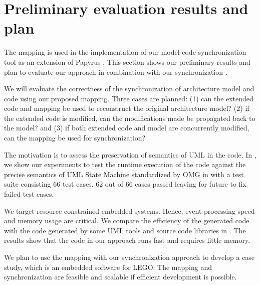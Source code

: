 \section{Preliminary evaluation results and plan}
\label{sec:evaluationplan}
The mapping is used in the implementation of our model-code synchronization tool \cite{foster2016} as an extension of Papyrus \cite{gerard201019}.
This section shows our preliminary results and plan to evaluate our approach in combination with our synchronization \cite{foster2016}.

\noindent
{}
We will evaluate the correctness of the synchronization of architecture model and code using our proposed mapping.
Three cases are planned: (1) can the extended code and mapping be used to reconstruct the original architecture model? (2) if the extended code is modified, can the modifications made be propagated back to the model? and (3) if both extended code and model are concurrently modified, can the mapping be used for synchronization?

\noindent
{}
The motivation is to assess the preservation of semantics of UML in the code.
In \cite{fullusm}, we show our experiments to test the runtime execution of the code against the precise semantics of UML State Machine standardized by OMG in \cite{PSSM} with a test suite consisting 66 test cases.
62 out of 66 cases passed leaving for future to fix failed test cases.


\noindent
{}
We target resource-constrained embedded systems.
Hence, event processing speed and memory usage are critical.
We compare the efficiency of the generated code with the code generated by some UML tools and source code libraries in \cite{fullusm}.
The results show that the code in our approach runs fast and requires little memory.

\noindent
{}
We plan to use the mapping with our synchronization approach to develop a case study, which is an embedded software for LEGO.
The mapping and synchronization are feasible and scalable if efficient development is possible.

	
